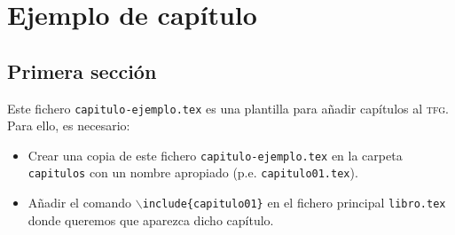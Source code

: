 
\chapter{Ejemplo de capítulo}

\section{Primera sección}

Este fichero \texttt{capitulo-ejemplo.tex} es una plantilla para añadir capítulos al \textsc{tfg}. Para ello, es necesario:
\begin{itemize}
  \item Crear una copia de este fichero \texttt{capitulo-ejemplo.tex} en la carpeta \texttt{capitulos} con un nombre apropiado (p.e. \texttt{capitulo01.tex}).
  \item Añadir el comando \texttt{$\backslash$include\{capitulo01\}} en el fichero principal \texttt{libro.tex} donde queremos que aparezca dicho capítulo.
\end{itemize}


\endinput
